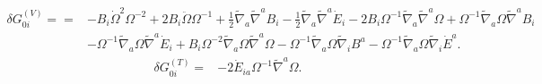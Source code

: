 \documentclass[10pt,letterpaper]{article}
\begin{document}
\begin{align}
\delta G_{0i}^{(V)}={}={}&- B_{i} \dot{\Omega}^2 \Omega^{-2}
 + 2 B_{i} \ddot{\Omega} \Omega^{-1}
 + \tfrac{1}{2} \tilde{\nabla}_{a}\tilde{\nabla}^{a}B_{i}
 -  \tfrac{1}{2} \tilde{\nabla}_{a}\tilde{\nabla}^{a}\dot{E}_{i}
 - 2 B_{i} \Omega^{-1} \tilde{\nabla}_{a}\tilde{\nabla}^{a}\Omega
 + \Omega^{-1} \tilde{\nabla}_{a}\Omega \tilde{\nabla}^{a}B_{i}\nonumber\\
& -  \Omega^{-1} \tilde{\nabla}_{a}\Omega \tilde{\nabla}^{a}\dot{E}_{i}
 + B_{i} \Omega^{-2} \tilde{\nabla}_{a}\Omega \tilde{\nabla}^{a}\Omega
 -  \Omega^{-1} \tilde{\nabla}_{a}\Omega \tilde{\nabla}_{i}B^{a}
 -  \Omega^{-1} \tilde{\nabla}_{a}\Omega \tilde{\nabla}_{i}\dot{E}^{a}.
\end{align}
\begin{align}
\delta G_{0i}^{(T)}={}&-2 \dot{E}_{ia} \Omega^{-1} \tilde{\nabla}^{a}\Omega.
\end{align}
\end{document}
